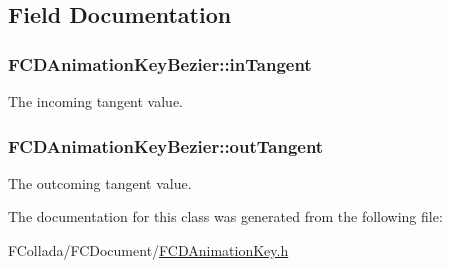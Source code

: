 \subsection{Field Documentation}
\hypertarget{classFCDAnimationKeyBezier_a9376d6dde01d5a78629935b1bebf1ac1}{
\subsubsection[{inTangent}]{ {\bf FCDAnimationKeyBezier::inTangent}}}
\label{classFCDAnimationKeyBezier_a9376d6dde01d5a78629935b1bebf1ac1}
The incoming tangent value. \hypertarget{classFCDAnimationKeyBezier_a46baf873490cd046c4b54ea4f8926bf7}{
\subsubsection[{outTangent}]{ {\bf FCDAnimationKeyBezier::outTangent}}}
\label{classFCDAnimationKeyBezier_a46baf873490cd046c4b54ea4f8926bf7}
The outcoming tangent value. 

The documentation for this class was generated from the following file:\begin{DoxyCompactItemize}
\item 
FCollada/FCDocument/\hyperlink{FCDAnimationKey_8h}{FCDAnimationKey.h}\end{DoxyCompactItemize}
